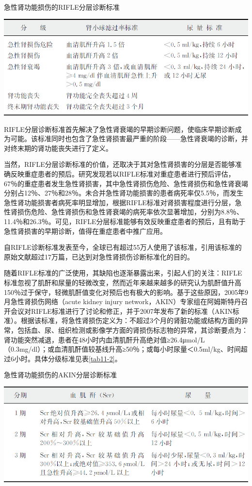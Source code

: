 \begin{table}[htbp]
\centering
\caption{急性肾功能损伤的RIFLE分层诊断标准}
\label{tab11-1}
\includegraphics{./images/Image00085.jpg}
\end{table}

RIFLE分层诊断标准首先解决了急性肾衰竭的早期诊断问题，使临床早期诊断成为可能。该标准同时也包含了急性肾损害最严重的阶段------急性肾衰竭的诊断，并对终末期的肾功能丧失进行了定义。

当然，RIFLE分层诊断标准的价值，还取决于其对急性肾损害的分层是否能够准确反映重症患者的预后。研究发现若以RIFLE标准对重症患者进行预后评估，67％的重症患者发生急性肾损害，其中急性肾损伤危险、急性肾损伤和急性肾衰竭分别占12％、27％和28％。未合并急性肾功能损害的患者病死率仅5.5％，而发生急性肾功能损害者病死率明显增加，根据RIFLE标准对肾损害程度进行分层，急性肾损伤危险、急性肾损伤和急性肾衰竭的病死率依次显著增加，分别为8.8％、11.4％和26.3％。可见，RIFLE分层标准能够有效反映重症患者的预后，且有助于急性肾损害的早期诊断，值得在重症患者中推广应用。

自RIFLE诊断标准发表至今，全球已有超过55万人使用了该标准，引用该标准的原始文献超过17万篇，已达到对急性肾损伤诊断标准化的目的。

随着RIFLE标准的广泛使用，其缺陷也逐渐暴露出来，引起人们的关注：RIFLE标准忽视了肌酐和尿量的轻微改变，然而近年来越来越多的研究认为肌酐值升高150％过于保守，轻微肌酐值变化对预后也有极大的影响。基于这些原因，2005年9月急性肾损伤网络（acute
kidney injury
network，AKIN）专家组在阿姆斯特丹召开会议对RIFLE标准进行了讨论和修正，并于2007年发布了新的标准（AKIN标准）。根据该标准，将急性肾损伤定义为：不超过3个月的肾脏功能或结构方面的异常，包括血、尿、组织检测或影像学方面的肾损伤标志物的异常，其诊断要点为：肾功能突然减退，患者在48小时内血清肌酐升高绝对值≥26.4μmol/L（0.3mg/dl）；或血清肌酐值较基线升高≥50％；或每小时尿量＜0.5ml/kg、时间超过6小时。具体分级标准见表\ref{tab11-2}。

\begin{table}[htbp]
\centering
\caption{急性肾功能损伤的AKIN分层诊断标准}
\label{tab11-2}
\includegraphics{./images/Image00086.jpg}
\end{table}

